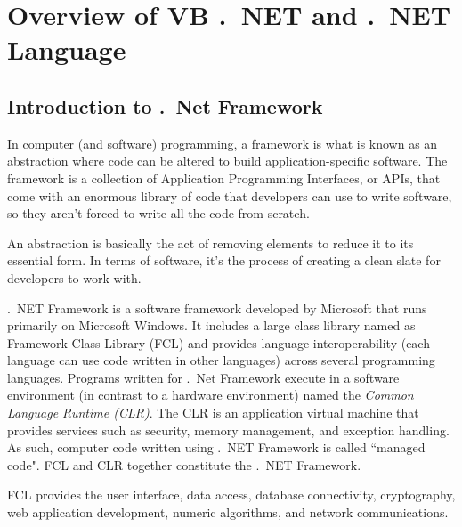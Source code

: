 
\chapter{Overview of VB .\ NET and {\cs} .\ NET Language}


\section{Introduction to .\ Net Framework}

In computer (and software) programming, a framework is what is known as an abstraction where code can be altered to build application-specific software. The framework is a collection of Application Programming Interfaces, or APIs, that come with an enormous library of code that developers can use to write software, so they aren’t forced to write all the code from scratch.

An abstraction is basically the act of removing elements to reduce it to its essential form. In terms of software, it's the process of creating a clean slate for developers to work with.

.\ NET Framework is a software framework developed by Microsoft that runs primarily on Microsoft Windows. It includes a large class library named as Framework Class Library (FCL) and provides language interoperability (each language can use code written in other languages) across several programming languages. Programs written for .\ Net Framework execute in a software environment (in contrast to a hardware environment) named the \textit{Common Language Runtime (CLR)}. The CLR is an application virtual machine that provides services such as security, memory management, and exception handling. As such, computer code written using .\ NET Framework is called ``managed code". FCL and CLR together constitute the .\ NET Framework. 

FCL provides the user interface, data access, database connectivity, cryptography, web application development, numeric algorithms, and network communications.

